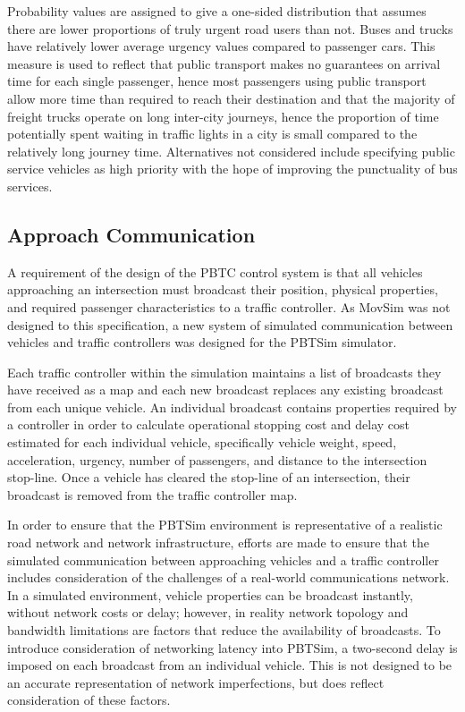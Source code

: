 Probability values are assigned to give a one-sided distribution that assumes there are lower proportions of truly urgent road users than not. Buses and trucks have relatively lower average urgency values compared to passenger cars. This measure is used to reflect that public transport makes no guarantees on arrival time for each single passenger, hence most passengers using public transport allow more time than required to reach their destination and that the majority of freight trucks operate on long inter-city journeys, hence the proportion of time potentially spent waiting in traffic lights in a city is small compared to the relatively long journey time. Alternatives not considered include specifying public service vehicles as high priority with the hope of improving the punctuality of bus services. %

\subsection{Approach Communication}

A requirement of the design of the PBTC control system is that all vehicles approaching an intersection must broadcast their position, physical properties, and required passenger characteristics to a traffic controller. As MovSim was not designed to this specification, a new system of simulated communication between vehicles and traffic controllers was designed for the PBTSim simulator.

Each traffic controller within the simulation maintains a list of broadcasts they have received as a map and each new broadcast replaces any existing broadcast from each unique vehicle. An individual broadcast contains properties required by a controller in order to calculate operational stopping cost and delay cost estimated for each individual vehicle, specifically vehicle weight, speed, acceleration, urgency, number of passengers, and distance to the intersection stop-line. Once a vehicle has cleared the stop-line of an intersection, their broadcast is removed from the traffic controller map. 

In order to ensure that the PBTSim environment is representative of a realistic road network and network infrastructure, efforts are made to ensure that the simulated communication between approaching vehicles and a traffic controller includes consideration of the challenges of a real-world communications network. In a simulated environment, vehicle properties can be broadcast instantly, without network costs or delay; however, in reality network topology and bandwidth limitations are factors that reduce the availability of broadcasts. To introduce consideration of networking latency into PBTSim, a two-second delay is imposed on each broadcast from an individual vehicle. This is not designed to be an accurate representation of network imperfections, but does reflect consideration of these factors.

